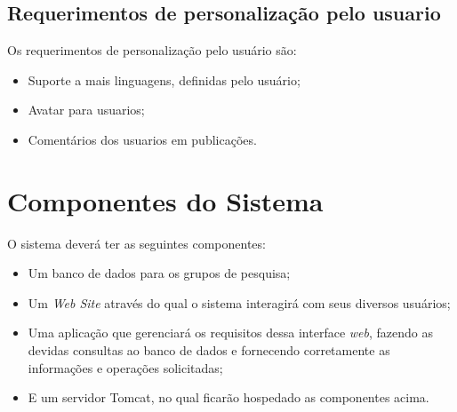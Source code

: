 \documentclass[11pt, a4paper]{article}
\begin{document}
		\subsection{Requerimentos de personalização pelo usuario}
			\noindent Os requerimentos de personalização pelo usuário são:
			\begin{itemize}
				\item Suporte a mais linguagens, definidas pelo usuário;
				\item Avatar para usuarios;
				\item Comentários dos usuarios em publicações.
			\end{itemize}
				
    \section{Componentes do Sistema}
		\noindent O sistema deverá ter as seguintes componentes:
		\begin{itemize}
			\item Um banco de dados para os grupos de pesquisa;
			\item Um \textit{Web Site} através do qual o sistema interagirá com
			seus diversos usuários;
			\item Uma aplicação que gerenciará os requisitos dessa interface
			\textit{web}, fazendo as devidas consultas ao banco de dados e
			fornecendo corretamente as informações e operações solicitadas;
			\item E um servidor Tomcat, no qual ficarão hospedado as
			componentes acima.
		\end{itemize}
    
\end{document}
